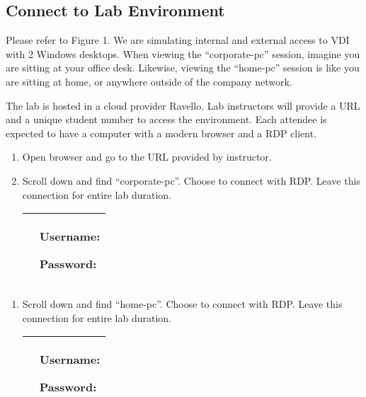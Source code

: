 \documentclass[letterpaper,10pt,english]{sphinxmanual}
\begin{document}


\subsection{Connect to Lab Environment}
\label{\detokenize{class2/labinfo:connect-to-lab-environment}}
Please refer to Figure 1. We are simulating internal and external access
to VDI with 2 Windows desktops. When viewing the “corporate-pc” session,
imagine you are sitting at your office desk. Likewise, viewing the
“home-pc” session is like you are sitting at home, or anywhere outside
of the company network.

The lab is hosted in a cloud provider Ravello. Lab instructors will
provide a URL and a unique student number to access the environment.
Each attendee is expected to have a computer with a modern browser and a
RDP client.
\begin{enumerate}
\item {} 
Open browser and go to the URL provided by instructor.

\item {} 
Scroll down and find “corporate-pc”. Choose to connect with RDP.
Leave this connection for entire lab duration.


\begin{savenotes}\sphinxattablestart
\centering
\begin{tabulary}{\linewidth}[t]{|T|T|}
\hline

&
Username: 

Password: 
\\
\hline
\end{tabulary}
\par
\sphinxattableend\end{savenotes}

\end{enumerate}
\begin{enumerate}
\item {} 
Scroll down and find “home-pc”. Choose to connect with RDP. Leave
this connection for entire lab duration.


\begin{savenotes}\sphinxattablestart
\centering
\begin{tabulary}{\linewidth}[t]{|T|T|}
\hline

&
Username: 

Password: 
\\
\hline
\end{tabulary}
\par
\sphinxattableend\end{savenotes}

\end{enumerate}
\end{document}
